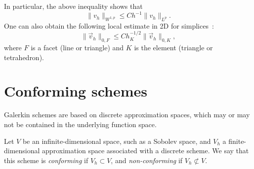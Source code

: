 In particular, the above inequality shows that
\begin{equation*}
    \| v_h \|_{W^{1,p}} \leq C h^{-1} \| v_h \|_{L^p}.
\end{equation*}
One can also obtain the following local estimate in 2D for simplices~\cite{warburton2003constants}:
\begin{equation}
    \| \vec v_h \|_{0,F} \leq C h_K^{-1/2} \| \vec v_h \|_{0,K},
\end{equation}
where $F$ is a facet (line or triangle) and $K$ is the element (triangle or tetrahedron).

\section{Conforming schemes}\label{sec:conforming-schemes}
Galerkin schemes are based on discrete approximation spaces, which may or may not be contained in the underlying function space.
\begin{definition}\label{def:conforming-scheme}
    Let $V$ be an infinite-dimensional space, such as a Sobolev space, and $V_h$ a finite-dimensional approximation space associated with a discrete scheme. We say that this scheme is \emph{conforming} if $V_h\subset V$, and \emph{non-conforming} if $V_h\not\subset V$. 
\end{definition}


